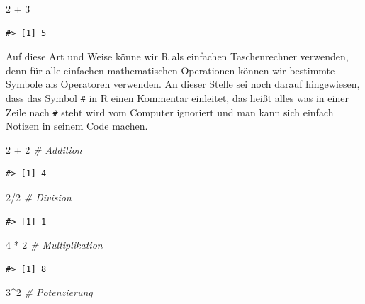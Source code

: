 \documentclass[]{tufte-book}
\newenvironment{Shaded}{}{}
\newcommand{\DecValTok}[1]{\textcolor[rgb]{0.25,0.63,0.44}{#1}}
\newcommand{\StringTok}[1]{\textcolor[rgb]{0.25,0.44,0.63}{#1}}
\newcommand{\CommentTok}[1]{\textcolor[rgb]{0.38,0.63,0.69}{\textit{#1}}}
\newcommand{\OperatorTok}[1]{\textcolor[rgb]{0.40,0.40,0.40}{#1}}
\begin{document}
\begin{Shaded}
\begin{Highlighting}[]
\DecValTok{2} \OperatorTok{+}\StringTok{ }\DecValTok{3}
\end{Highlighting}
\end{Shaded}

\begin{verbatim}
#> [1] 5
\end{verbatim}

Auf diese Art und Weise könne wir R als einfachen Taschenrechner
verwenden, denn für alle einfachen mathematischen Operationen können wir
bestimmte Symbole als Operatoren verwenden. An dieser Stelle sei noch
darauf hingewiesen, dass das Symbol \texttt{\#} in R einen Kommentar
einleitet, das heißt alles was in einer Zeile nach \texttt{\#} steht
wird vom Computer ignoriert und man kann sich einfach Notizen in seinem
Code machen.

\begin{Shaded}
\begin{Highlighting}[]
\DecValTok{2} \OperatorTok{+}\StringTok{ }\DecValTok{2}  \CommentTok{# Addition}
\end{Highlighting}
\end{Shaded}

\begin{verbatim}
#> [1] 4
\end{verbatim}

\begin{Shaded}
\begin{Highlighting}[]
\DecValTok{2}\OperatorTok{/}\DecValTok{2}  \CommentTok{# Division}
\end{Highlighting}
\end{Shaded}

\begin{verbatim}
#> [1] 1
\end{verbatim}

\begin{Shaded}
\begin{Highlighting}[]
\DecValTok{4} \OperatorTok{*}\StringTok{ }\DecValTok{2}  \CommentTok{# Multiplikation}
\end{Highlighting}
\end{Shaded}

\begin{verbatim}
#> [1] 8
\end{verbatim}

\begin{Shaded}
\begin{Highlighting}[]
\DecValTok{3}\OperatorTok{^}\DecValTok{2}  \CommentTok{# Potenzierung}
\end{Highlighting}
\end{Shaded}
\end{document}
